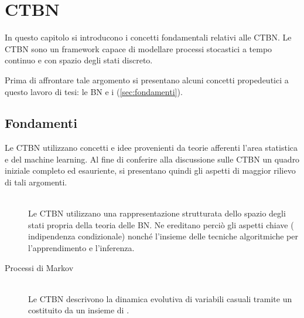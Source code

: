 
\chapter{\texorpdfstring{CTBN}{\ctbn{}}}
\label{cap:ctbn}
\acresetall
In questo capitolo si introducono i concetti fondamentali relativi alle \ac{CTBN}. Le \acs{CTBN} sono un framework capace di modellare processi stocastici a tempo continuo e con spazio degli stati discreto.

Prima di affrontare tale argomento si presentano alcuni concetti propedeutici a questo lavoro di tesi: le \ac{BN} e i \mprocess{} (\autoref{sec:fondamenti}).
\section{Fondamenti}
\label{sec:fondamenti}
Le \acl{CTBN} utilizzano concetti e idee provenienti da teorie afferenti l'area statistica e del machine learning. Al fine di conferire alla discussione sulle \acs{CTBN} un quadro iniziale completo ed esauriente, si presentano quindi gli aspetti di maggior rilievo di tali argomenti.
\begin{description}
\item[\bn{}] \hfill \\
Le \acl{CTBN} utilizzano una rappresentazione strutturata dello spazio degli stati propria della teoria delle \acl{BN}. Ne ereditano perciò gli aspetti chiave (\eg{} indipendenza condizionale) nonché l'insieme delle tecniche algoritmiche per l'apprendimento e l'inferenza.
\item[Processi di Markov]\label{sec:fondamenti-mp}\hfill \\
Le \acl{CTBN} descrivono la dinamica evolutiva di variabili casuali tramite un \mprocess*{} \omog*{} costituito da un insieme di \mprocess{} \cond{}.
\end{description} 


